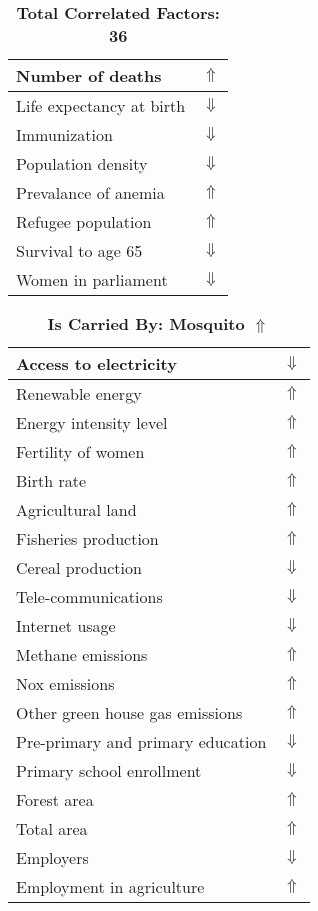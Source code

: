\documentclass[12pt,notitlepage,oneside]{report}
\begin{document}
\begin{table}[!htb]
\begin{tabular}{|l|l|}
Number of deaths & $\Uparrow$\\ \hline
Life expectancy at birth & $\Downarrow$\\ \hline
Immunization & $\Downarrow$\\ \hline
Population density & $\Downarrow$\\ \hline
Prevalance of anemia & $\Uparrow$\\ \hline
Refugee population & $\Uparrow$\\ \hline
Survival to age 65 & $\Downarrow$\\ \hline
Women in parliament & $\Downarrow$\\ \hline
\end{tabular}
\caption*{\textbf{Total Correlated Factors: 36}}
\end{table}
\clearpage
\begin{table}[!htb]
\caption{\textbf{Is Carried By: Mosquito $\Uparrow$}}
\centering
\label{Correlated Socio-economic Factors0}
\begin{tabular}{|l|l|}
\hline
Access to electricity & $\Downarrow$\\ \hline
Renewable energy & $\Uparrow$\\ \hline
Energy intensity level & $\Uparrow$\\ \hline
Fertility of women & $\Uparrow$\\ \hline
Birth rate & $\Uparrow$\\ \hline
Agricultural land & $\Uparrow$\\ \hline
Fisheries production & $\Uparrow$\\ \hline
Cereal production & $\Downarrow$\\ \hline
Tele-communications & $\Downarrow$\\ \hline
Internet usage & $\Downarrow$\\ \hline
Methane emissions & $\Uparrow$\\ \hline
Nox emissions & $\Uparrow$\\ \hline
Other green house gas emissions & $\Uparrow$\\ \hline
Pre-primary and primary education & $\Downarrow$\\ \hline
Primary school enrollment & $\Downarrow$\\ \hline
Forest area & $\Uparrow$\\ \hline
Total area & $\Uparrow$\\ \hline
Employers & $\Downarrow$\\ \hline
Employment in agriculture & $\Uparrow$\\ \hline

\end{tabular}
\end{table}
\end{document}
